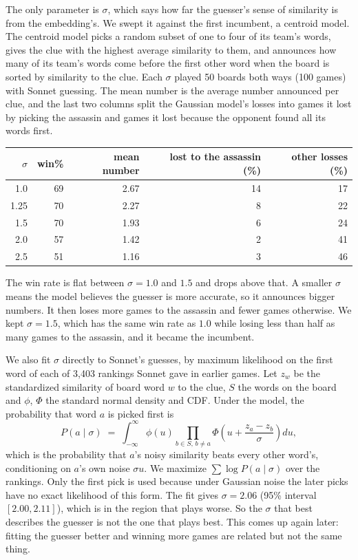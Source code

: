 \documentclass[11pt]{article}
\begin{document}
The only parameter is $\sigma$, which says how far the guesser's sense of
similarity is from the embedding's. We swept it against the first incumbent, a
centroid model. The centroid model picks a random subset of one to four of its
team's words, gives the clue with the highest average similarity to them, and
announces how many of its team's words come before the first other word when the
board is sorted by similarity to the clue. Each $\sigma$ played 50 boards both
ways (100 games) with Sonnet guessing. The mean number is the average number
announced per clue, and the last two columns split the Gaussian model's losses
into games it lost by picking the assassin and games it lost because the
opponent found all its words first.

\begin{center}
\begin{tabular}{rrrrr}
\toprule
$\sigma$ & win\% & mean number & lost to the assassin (\%) & other losses (\%) \\
\midrule
1.0  & 69 & 2.67 & 14 & 17 \\
1.25 & 70 & 2.27 & 8  & 22 \\
1.5  & 70 & 1.93 & 6  & 24 \\
2.0  & 57 & 1.42 & 2  & 41 \\
2.5  & 51 & 1.16 & 3  & 46 \\
\bottomrule
\end{tabular}
\end{center}

The win rate is flat between $\sigma = 1.0$ and $1.5$ and drops above that. A
smaller $\sigma$ means the model believes the guesser is more accurate, so it
announces bigger numbers. It then loses more games to the assassin and fewer
games otherwise. We kept $\sigma = 1.5$, which has the same win rate as $1.0$
while losing less than half as many games to the assassin, and it became the
incumbent.

We also fit $\sigma$ directly to Sonnet's guesses, by maximum likelihood on the
first word of each of 3,403 rankings Sonnet gave in earlier games. Let $z_w$ be
the standardized similarity of board word $w$ to the clue, $S$ the words on the
board and $\phi$, $\Phi$ the standard normal density and CDF. Under the model, the
probability that word $a$ is picked first is
\[
P(a \mid \sigma) \;=\; \int_{-\infty}^{\infty} \phi(u) \prod_{b \in S,\, b \neq a}
\Phi\!\left(u + \frac{z_a - z_b}{\sigma}\right) du,
\]
which is the probability that $a$'s noisy similarity beats every other word's,
conditioning on $a$'s own noise $\sigma u$. We maximize $\sum \log P(a \mid
\sigma)$ over the rankings. Only the first pick is used because under Gaussian
noise the later picks have no exact likelihood of this form. The fit gives
$\sigma = 2.06$ (95\% interval $[2.00, 2.11]$), which is in the region that plays
worse. So the $\sigma$ that best describes the guesser is not the one that plays
best. This comes up again later: fitting the guesser better and winning more
games are related but not the same thing.
\end{document}
